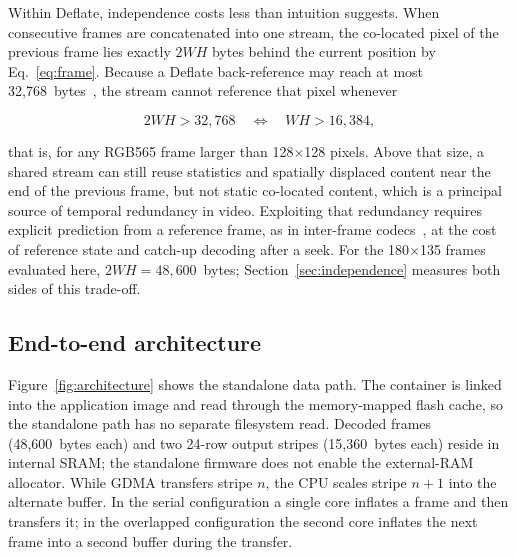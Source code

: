 \documentclass[11pt,twocolumn]{article}
\begin{document}
Within Deflate, independence costs less than intuition suggests.  When
consecutive frames are concatenated into one stream, the co-located pixel of
the previous frame lies exactly $2WH$ bytes behind the current position by
Eq.~\eqref{eq:frame}.  Because a Deflate back-reference may reach at most
32,768~bytes~\cite{deutsch1996deflate}, the stream cannot reference that pixel
whenever

\begin{equation}
2WH > 32{,}768 \quad\Longleftrightarrow\quad WH > 16{,}384,
\label{eq:window}
\end{equation}

that is, for any RGB565 frame larger than 128$\times$128 pixels.  Above that
size, a shared stream can still reuse statistics and spatially displaced
content near the end of the previous frame, but not static co-located content,
which is a principal source of temporal redundancy in video.  Exploiting that
redundancy requires explicit prediction from a reference frame, as in
inter-frame codecs~\cite{wiegand2003overview}, at the cost of reference state
and catch-up decoding after a seek.  For the 180$\times$135 frames evaluated
here, $2WH=48{,}600$~bytes; Section~\ref{sec:independence} measures both
sides of this trade-off.

\subsection{End-to-end architecture}

Figure~\ref{fig:architecture} shows the standalone data path.  The container
is linked into the application image and read through the memory-mapped flash
cache, so the standalone path has no separate filesystem read.  Decoded frames
(48,600~bytes each) and two 24-row output stripes (15,360~bytes each) reside
in internal SRAM; the standalone firmware does not enable the external-RAM
allocator.  While GDMA transfers stripe $n$, the CPU scales stripe $n+1$ into
the alternate buffer.  In the serial configuration a single core inflates a
frame and then transfers it; in the overlapped configuration the second core
inflates the next frame into a second buffer during the transfer.
\end{document}
